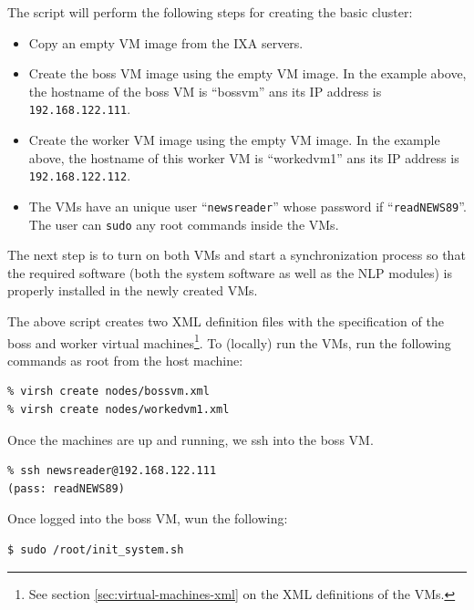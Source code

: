 \documentclass[a4]{article}
\begin{document}
The script will perform the following steps for creating the basic cluster:
\begin{itemize}
\item Copy an empty VM image from the IXA servers.
\item Create the boss VM image using the empty VM image. In the example
  above, the hostname of the boss VM is ``\textrm{bossvm}'' ans its IP
  address is \texttt{192.168.122.111}.
\item Create the worker VM image using the empty VM image.  In the example
  above, the hostname of this worker VM is ``\textrm{workedvm1}'' ans its IP
  address is \texttt{192.168.122.112}.
\item The VMs have an unique user ``\texttt{newsreader}'' whose password if
  ``\texttt{readNEWS89}''. The user can \texttt{sudo} any root commands
  inside the VMs.
\end{itemize}

The next step is to turn on both VMs and start a synchronization process so
that the required software (both the system software as well as the NLP
modules) is properly installed in the newly created VMs.

The above script creates two XML definition files with the specification of
the boss and worker virtual machines\footnote{See section \ref{sec:virtual-machines-xml} on the XML
  definitions of the VMs.}. To (locally) run the VMs, run the following
commands as root from the host machine:

\begin{verbatim}
% virsh create nodes/bossvm.xml
% virsh create nodes/workedvm1.xml
\end{verbatim}

Once the machines are up and running, we ssh into the boss VM.

\begin{verbatim}
% ssh newsreader@192.168.122.111
(pass: readNEWS89)
\end{verbatim}

Once logged into the boss VM, wun the following:

\begin{verbatim}
$ sudo /root/init_system.sh
\end{verbatim}
\end{document}
